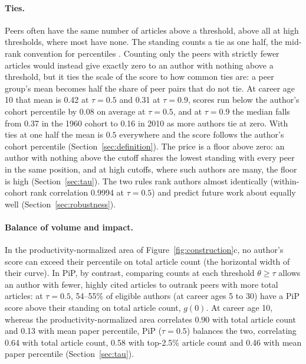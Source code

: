 \documentclass[11pt]{article}
\begin{document}
\paragraph{Ties.} Peers often have the same number of articles above a threshold, above all at high thresholds, where
most have none. The standing counts a tie as one half, the mid-rank convention for percentiles
\citep{hazen1914storage,bornmann2013use,waltman2013percentile}. Counting only the peers with strictly fewer articles
would instead give exactly zero to an author with nothing above a threshold, but it ties the scale of the score to how
common ties are: a peer group's mean becomes half the share of peer pairs that do not tie. At career age 10 that mean is
0.42 at $\tau = 0.5$ and 0.31 at $\tau = 0.9$, scores run below the author's cohort percentile by 0.08 on
average at $\tau = 0.5$, and at $\tau = 0.9$ the median falls from 0.37 in the 1960 cohort to 0.16 in 2010 as
more authors tie at zero. With ties at one half the mean is $0.5$ everywhere and the score follows the author's cohort
percentile (Section~\ref{sec:definition}). The price is a floor above zero: an author with nothing above the cutoff
shares the lowest standing with every peer in the same position, and at high cutoffs, where such authors are many, the
floor is high (Section~\ref{sec:tau}). The two rules rank authors almost identically (within-cohort rank correlation
0.9994 at $\tau = 0.5$) and predict future work about equally well (Section~\ref{sec:robustness}).

\paragraph{Balance of volume and impact.} In the productivity-normalized area of Figure~\ref{fig:construction}c, no
author's score can exceed their percentile on total article count (the horizontal width of their curve). In PiP, by
contrast, comparing counts at each threshold $\theta \ge \tau$ allows an author with fewer, highly cited articles to
outrank peers with more total articles: at $\tau = 0.5$, 54--55\% of eligible authors (at career ages 5 to 30) have a
PiP score above their standing on total article count, $g(0)$. At career age 10, whereas the productivity-normalized area correlates
0.90 with total article count and 0.13 with mean paper percentile, PiP ($\tau = 0.5$) balances the two, correlating 0.64
with total article count, 0.58 with top-2.5\% article count and 0.46 with mean paper percentile (Section~\ref{sec:tau}).
\end{document}
